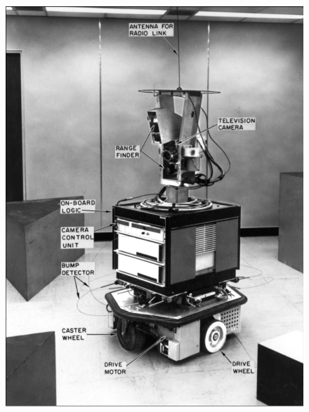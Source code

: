 \documentclass[11pt]{article}
\begin{document}
\begin{figure}[h]
\begin{minipage}{0.3\textwidth}
        \includegraphics[width=\linewidth]{../img/shakey_smoothed.png}
    \end{minipage}\hfill
    \begin{minipage}{0.3\textwidth}
        \centering

\end{minipage}
\end{figure}
\end{document}
